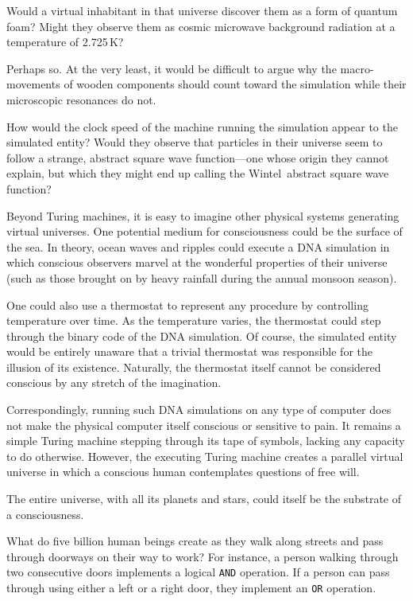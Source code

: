 Would a virtual inhabitant in that universe discover them as a form of quantum foam? Might they observe them as cosmic microwave background radiation at a temperature of 2.725\,K?

Perhaps so. At the very least, it would be difficult to argue why the macro-movements of wooden components should count toward the simulation while their microscopic resonances do not.

How would the clock speed of the machine running the simulation appear to the simulated entity? Would they observe that particles in their universe seem to follow a strange, abstract square wave function---one whose origin they cannot explain, but which they might end up calling the Wintel\texttrademark\ abstract square wave function?

Beyond Turing machines, it is easy to imagine other physical systems generating virtual universes. One potential medium for consciousness could be the surface of the sea. In theory, ocean waves and ripples could execute a DNA simulation in which conscious observers marvel at the wonderful properties of their universe (such as those brought on by heavy rainfall during the annual monsoon season).

One could also use a thermostat to represent any procedure by controlling temperature over time. As the temperature varies, the thermostat could step through the binary code of the DNA simulation. Of course, the simulated entity would be entirely unaware that a trivial thermostat was responsible for the illusion of its existence. Naturally, the thermostat itself cannot be considered conscious by any stretch of the imagination.

Correspondingly, running such DNA simulations on any type of computer does not make the physical computer itself conscious or sensitive to pain. It remains a simple Turing machine stepping through its tape of symbols, lacking any capacity to do otherwise. However, the executing Turing machine creates a parallel virtual universe in which a conscious human contemplates questions of free will.

The entire universe, with all its planets and stars, could itself be the substrate of a consciousness.

What do five billion human beings create as they walk along streets and pass through doorways on their way to work? For instance, a person walking through two consecutive doors implements a logical \texttt{AND} operation. If a person can pass through using either a left or a right door, they implement an \texttt{OR} operation.

